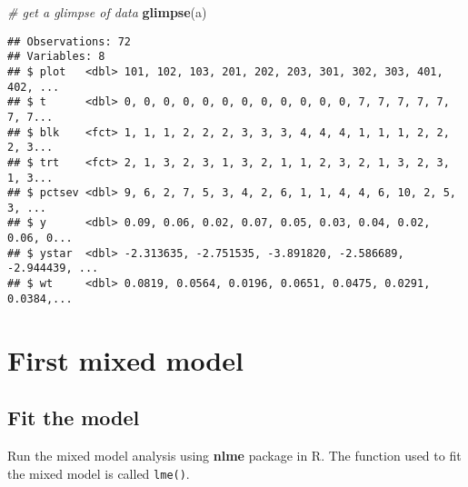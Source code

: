\documentclass[]{book}
\newenvironment{Shaded}{\begin{snugshade}}{\end{snugshade}}
\newcommand{\CommentTok}[1]{\textcolor[rgb]{0.56,0.35,0.01}{\textit{#1}}}
\newcommand{\KeywordTok}[1]{\textcolor[rgb]{0.13,0.29,0.53}{\textbf{#1}}}
\newcommand{\NormalTok}[1]{#1}
\begin{document}
\begin{Shaded}
\begin{Highlighting}[]
\CommentTok{# get a glimpse of data}
\KeywordTok{glimpse}\NormalTok{(a)}
\end{Highlighting}
\end{Shaded}

\begin{verbatim}
## Observations: 72
## Variables: 8
## $ plot   <dbl> 101, 102, 103, 201, 202, 203, 301, 302, 303, 401, 402, ...
## $ t      <dbl> 0, 0, 0, 0, 0, 0, 0, 0, 0, 0, 0, 0, 7, 7, 7, 7, 7, 7, 7...
## $ blk    <fct> 1, 1, 1, 2, 2, 2, 3, 3, 3, 4, 4, 4, 1, 1, 1, 2, 2, 2, 3...
## $ trt    <fct> 2, 1, 3, 2, 3, 1, 3, 2, 1, 1, 2, 3, 2, 1, 3, 2, 3, 1, 3...
## $ pctsev <dbl> 9, 6, 2, 7, 5, 3, 4, 2, 6, 1, 1, 4, 4, 6, 10, 2, 5, 3, ...
## $ y      <dbl> 0.09, 0.06, 0.02, 0.07, 0.05, 0.03, 0.04, 0.02, 0.06, 0...
## $ ystar  <dbl> -2.313635, -2.751535, -3.891820, -2.586689, -2.944439, ...
## $ wt     <dbl> 0.0819, 0.0564, 0.0196, 0.0651, 0.0475, 0.0291, 0.0384,...
\end{verbatim}

\hypertarget{first-mixed-model}{%
\section{First mixed model}\label{first-mixed-model}}

\hypertarget{fit-the-model}{%
\subsection{Fit the model}\label{fit-the-model}}

Run the mixed model analysis using \textbf{nlme} package in R. The function used to fit the mixed model is called \texttt{lme()}.
\end{document}

